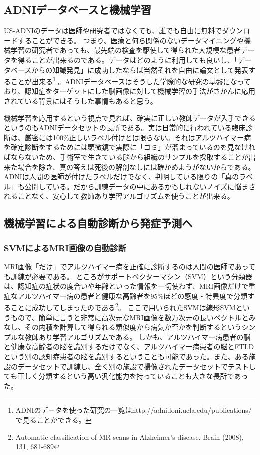 \subsection{ADNIデータベースと機械学習}
US-ADNIのデータは医師や研究者ではなくても、誰でも自由に無料でダウンロードすることができる。
つまり、医療と何ら関係のないデータマイニングや機械学習の研究者であっても、最先端の検査を駆使して得られた大規模な患者データを得ることが出来るのである。データはどのように利用しても良いし、「データベースからの知識発見」に成功したならば当然それを自由に論文として発表することが出来る\footnote{ADNIのデータを使った研究の一覧はhttp://adni.loni.ucla.edu/publications/で見ることができる。}
。ADNIデータベースはそうした学際的な研究の基盤になっており、認知症をターゲットにした脳画像に対して機械学習の手法がさかんに応用されている背景にはそうした事情もあると思う。

機械学習を応用するという視点で見れば、確実に正しい教師データが入手できるというのもADNIデータセットの長所である。実は日常的に行われている臨床診断は、厳密には100\%正しいラベル付けとは限らない。それはアルツハイマー病を確定診断をするためには顕微鏡で実際に「ゴミ」が溜まっているのを見なければならないため、手術室で生きている脳から組織のサンプルを採取することが出来た場合を除き、真の答えは死後の解剖なしには確かめようがないからである。ADNIは人間の医師が付けたラベルだけでなく、判明している限りの「真のラベル」も公開している。だから訓練データの中にあるかもしれないノイズに悩まされることなく、安心して教師あり学習アルゴリズムを使うことが出来る。
\subsection{機械学習による自動診断から発症予測へ}

\subsubsection{SVMによるMRI画像の自動診断}
MRI画像「だけ」でアルツハイマー病を正確に診断するのは人間の医師であっても訓練が必要である。
ところがサポートベクターマシン（SVM）という分類器は、認知症の症状の度合いや年齢といった情報を一切使わず、MRI画像だけで重症なアルツハイマー病の患者と健康な高齢者を95\%ほどの感度・特異度で分類することに成功してしまったのである\footnote{Automatic classification of MR scans in Alzheimer's disease. Brain (2008), 131, 681-689}。
ここで用いられたSVMは線形SVMというもので、簡単に言うと非常に高次元なMRI画像を数万次元の長いベクトルとみなし、その内積を計算して得られる類似度から病気か否かを判断するというシンプルな教師あり学習アルゴリズムである。
しかも、アルツハイマー病患者の脳と健康な高齢者の脳を識別するだけでなく、アルツハイマー病患者の脳とFTLDという別の認知症患者の脳を識別するということも可能であった。また、ある施設のデータセットで訓練し、全く別の施設で撮像されたデータセットでテストしても正しく分類するという高い汎化能力を持っていることも大きな長所であった。

